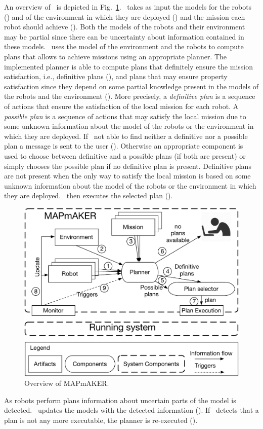 
An overview of \toolName\ is depicted in Fig.~\ref{fig:overview}.
\toolName\ takes as input the models for the robots () and of the environment in which they are deployed () and the mission each robot should achieve ().
Both the models of the robots and their environment may be partial since there can be uncertainty about information contained in these models.
\toolName\ uses the model of the environment and the robots to compute plans that allows to achieve missions using an appropriate planner.
The implemented planner is able to compute plans that definitely ensure the mission satisfaction, i.e., definitive plans  (), and plans that may ensure property satisfaction since they depend on some partial knowledge present in the models of the robots and the environment  ().
More precisely, a \emph{definitive plan} is a sequence of actions that ensure the satisfaction of the local mission for each robot. 
A \emph{possible plan} is a sequence of actions that may satisfy the local mission due to some unknown information about the model of the robots or the environment in which they are deployed. 
If \toolName\ not able to find neither a definitive nor a possible plan a message is sent to the user ().
Otherwise an appropriate component is used to choose between definitive and a possible plans (if both are present) or simply chooses the possible plan if no definitive plan is present.
Definitive plans are not present when the only way to satisfy the local mission is based on some unknown information about the model of the robots or the environment in which they are deployed. 
\toolName\ then executes the selected plan ().
\begin{figure}[b]
\begin{center}
\includegraphics[width=1\linewidth]{Figures/MAPmAKER.pdf}
\caption{Overview of  MAPmAKER.}
\label{fig:overview}
\end{center}
\end{figure}
As robots perform plans information about uncertain parts of the model is detected.
\toolName\ updates the   models with the detected information ().
If \toolName\  detects that a plan is not any more executable, the planner is re-executed ().





